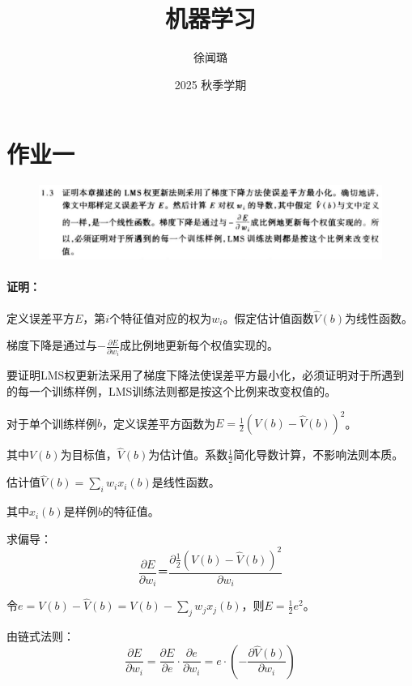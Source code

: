 \documentclass{article}
\title{机器学习}
\author{徐闻璐}
\date{2025 秋季学期}
\begin{document}
\maketitle

\newpage

\section{作业一}

    \begin{figure}[!h]
        \centering
        \includegraphics[width=1.2\linewidth]{image/1.3.jpg}
        \label{1.3}
    \end{figure}
        
\paragraph{证明：}
    定义误差平方$E$，第$i$个特征值对应的权为$w_{i}$。假定估计值函数$\hat{V}(b)$为线性函数。

    梯度下降是通过与$-\frac{\partial E}{\partial w_{i}}$成比例地更新每个权值实现的。
    
    要证明LMS权更新法采用了梯度下降法使误差平方最小化，必须证明对于所遇到的每一个训练样例，LMS训练法则都是按这个比例来改变权值的。

    对于单个训练样例$b$，定义误差平方函数为$E=\frac{1}{2}(V(b)-\hat{V}(b))^{2}$。

    其中$V(b)$为目标值，$\hat{V}(b)$为估计值。系数$\frac{1}{2}$简化导数计算，不影响法则本质。

    估计值$\hat{V}(b)=\sum_{i}w_ix_i(b)$是线性函数。

    其中$x_i(b)$是样例$b$的特征值。

    求偏导：$$\frac{\partial E}{\partial w_i}＝\frac{\partial \frac{1}{2}(V(b)-\hat{V}(b))^2}{\partial w_i}$$

    令$e=V(b)-\hat{V}(b)=V(b)-\sum_jw_jx_j(b)$，则$E=\frac{1}{2}e^2$。

    由链式法则：
    $$\frac{\partial E}{\partial w_i}=\frac{\partial E}{\partial e}\cdot \frac{\partial e}{\partial w_i}=e\cdot \left(-\frac{\partial \hat{V}(b)}{\partial w_i}\right)$$
\end{document}
